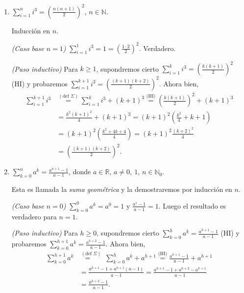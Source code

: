 \begin{enumerate}
\begin{enumerate}
        \item  $\displaystyle{ \sum_{i=1}^n i^3 = \left( \frac{n(n+1)}{2 }\right)^2}$, $n\in \mathbb N$.
        
        \rta Inducción en $n$.
        
        \textit{(Caso base $n=1$) } $\sum_{i=1}^1 i^3 = 1 = (\frac{1 \cdot 2}{2})^2$. Verdadero. 
        
        \textit{(Paso inductivo)} Para  $k \ge 1$,  supondremos cierto $\sum_{i=1}^k i^3 = \left( \frac{k(k+1)}{2 }\right)^2$ (HI) y probaremos $\sum_{i=1}^{k+1} i^3 = \left( \frac{(k+1)(k+2)}{2 }\right)^2$. Ahora bien,
        \begin{align*}
            \sum_{i=1}^{k+1} i^3 &\overset{(\text{def } \Sigma)}{=} \sum_{i=1}^k i^3 + (k+1)^3 \overset{\text{(HI)}}{=}  \left( \frac{k(k+1)}{2 }\right)^2 + (k+1)^3 \\
            &= \frac{k^2(k+1)^2}{4 } + (k+1)^3 = (k+1)^2 \left(\frac{k^2}{4 } + k+1 \right)\\
            &= (k+1)^2 \left(\frac{k^2+4k +4}{4 } \right) = (k+1)^2\frac{(k+2)^2}{4 } \\
            &= \left( \frac{(k+1)(k+2)}{2 }\right)^2.
        \end{align*}
        
        \item\label{ej-serie-geometrica}  $\displaystyle{ \sum_{k=0}^n a^k = \frac{a^{n+1}-1}{a-1}}$, donde $a\in {\mathbb R}$, $a \neq 0,\ 1$, $n\in \mathbb N_0$.
        
        \rta Esta es llamada la \textit{suma geométrica} y la demostraremos por inducción en $n$.
        
        \textit{(Caso base $n=0$) } $\sum_{k=0}^0 a^k = a^0 = 1$ y $\frac{a^{1}-1}{a-1}=1$. Luego el resultado es verdadero para  $n=1$. 
        
        \textit{(Paso inductivo)}  Para  $h \ge 0$,  supondremos cierto $\sum_{k=0}^h a^k = \frac{a^{h+1}-1}{a-1}$ (HI) y probaremos $\sum_{k=0}^{h+1} a^k = \frac{a^{h+2}-1}{a-1}$. Ahora bien, 
        \begin{align*}
            \sum_{k=0}^{h+1} a^k &\overset{(\text{def } \Sigma)}{=\quad} \;\sum_{k=0}^h a^k + a^{h+1} \overset{\text{(HI)}}{=} \frac{a^{h+1}-1}{a-1} +  a^{h+1} \\
            &= \frac{a^{h+1}-1 + a^{h+1}(a-1)}{a-1} = \frac{a^{h+1}-1 + a^{h+2}-a^{h+1}}{a-1} \\
            &=\frac{a^{h+2}-1}{a-1}.
        \end{align*}
        

\end{enumerate}
\end{enumerate}
